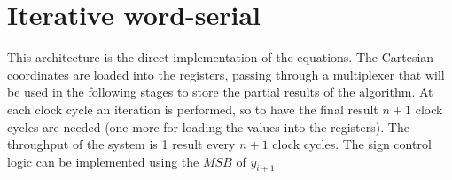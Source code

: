 \section{Iterative word-serial}\label{sec:wordserial}
This architecture is the direct implementation of the \cordic{} equations.
The Cartesian coordinates are loaded into the registers, passing through a
multiplexer that will be used in the following stages to store the partial
results of the algorithm.
At each clock cycle an iteration is performed, so to have the final result \(n+1\)
clock cycles are needed (one more for loading the values into the registers). 
The throughput of the system is 1 result every \(n+1\) clock cycles.
The sign control logic can be implemented using the \(MSB\) of \(y_{i+1}\)
